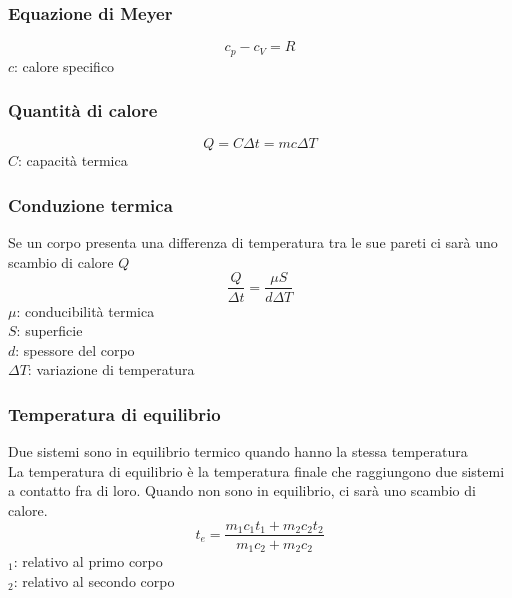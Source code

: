 \subsubsection{Equazione di Meyer}
\begin{equation*}
  c_p - c_V = R
\end{equation*}
$c$: calore specifico

\subsubsection{Quantità di calore}
\begin{equation*}
  Q = C\Delta t = mc\Delta T
\end{equation*}
$C$: capacità termica

\subsubsection{Conduzione termica}
\begin{center}
\end{center}
Se un corpo presenta una differenza di temperatura tra le sue pareti ci sarà uno scambio di calore
$Q$
\begin{equation*}
  \frac{Q}{\Delta t} = \frac{\mu S}{d\Delta T}
\end{equation*}
$\mu$: conducibilità termica\\
$S$: superficie\\
$d$: spessore del corpo\\
$\Delta T$: variazione di temperatura

\subsubsection{Temperatura di equilibrio}
Due sistemi sono in equilibrio termico quando hanno la stessa temperatura\\
La temperatura di equilibrio è la temperatura finale che raggiungono due sistemi a contatto fra di 
loro. Quando non sono in equilibrio, ci sarà uno scambio di calore.
\begin{equation*}
  t_e = \frac{m_1c_1t_1 + m_2c_2t_2}{m_1c_2 + m_2c_2}
\end{equation*}
$_1$: relativo al primo corpo\\
$_2$: relativo al secondo corpo

